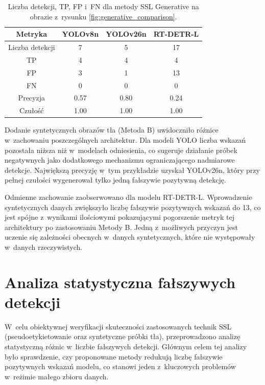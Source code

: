 \begin{table}[htbp]
\centering
\caption{Liczba detekcji, TP, FP i~FN dla metody SSL Generative na obrazie z~rysunku \ref{fig:generative_comparison}.}
\label{tab:generative_stats}
\begin{tabular}{|c|c|c|c|}
\hline
\textbf{Metryka} & \textbf{YOLOv8n} & \textbf{YOLOv26n} & \textbf{RT-DETR-L} \\ \hline
Liczba detekcji         & 7                & 5                 & 17                 \\ \hline
TP                      & 4                & 4                 & 4                  \\ \hline
FP                      & 3                & 1                 & 13                 \\ \hline
FN                      & 0                & 0                 & 0                  \\ \hline
Precyzja                & 0.57             & 0.80              & 0.24               \\ \hline
Czułość                 & 1.00             & 1.00              & 1.00               \\ \hline
\end{tabular}
\end{table}

Dodanie syntetycznych obrazów tła (Metoda B) uwidoczniło różnice w~zachowaniu poszczególnych architektur. Dla modeli YOLO liczba wskazań pozostała niższa niż w~modelach odniesienia, co sugeruje działanie próbek negatywnych jako dodatkowego mechanizmu ograniczającego nadmiarowe detekcje. Największą precyzję w~tym przykładzie uzyskał YOLOv26n, który przy pełnej czułości wygenerował tylko jedną fałszywie pozytywną detekcję.

Odmienne zachowanie zaobserwowano dla modelu RT-DETR-L. Wprowadzenie syntetycznych danych zwiększyło liczbę fałszywie pozytywnych wskazań do 13, co jest spójne z~wynikami ilościowymi pokazującymi pogorszenie metryk tej architektury po zastosowaniu Metody B. Jedną z~możliwych przyczyn jest uczenie się zależności obecnych w~danych syntetycznych, które nie występowały w~danych rzeczywistych.

\section{Analiza statystyczna fałszywych detekcji}

W~celu obiektywnej weryfikacji skuteczności zastosowanych technik SSL (pseudoetykietowanie oraz syntetyczne próbki tła), przeprowadzono analizę statystyczną różnic w~liczbie fałszywych detekcji. Głównym celem tej analizy było sprawdzenie, czy proponowane metody redukują liczbę fałszywie pozytywnych wskazań modelu, co stanowi jeden z~kluczowych problemów w~reżimie małego zbioru danych.
